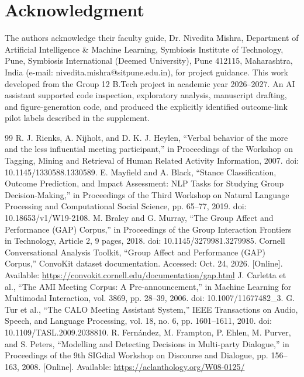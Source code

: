 \documentclass[journal]{IEEEtran}
\begin{document}
\section*{Acknowledgment}
The authors acknowledge their faculty guide, Dr. Nivedita Mishra, Department of Artificial Intelligence \& Machine Learning, Symbiosis Institute of Technology, Pune, Symbiosis International (Deemed University), Pune 412115, Maharashtra, India (e-mail: nivedita.mishra@sitpune.edu.in), for project guidance. This work developed from the Group 12 B.Tech project in academic year 2026--2027. An AI assistant supported code inspection, exploratory analysis, manuscript drafting, and figure-generation code, and produced the explicitly identified outcome-link pilot labels described in the supplement.

\clearpage
\begin{thebibliography}{99}
 R. J. Rienks, A. Nijholt, and D. K. J. Heylen, ``Verbal behavior of the more and the less influential meeting participant,'' in Proceedings of the Workshop on Tagging, Mining and Retrieval of Human Related Activity Information, 2007. doi: 10.1145/1330588.1330589.
 E. Mayfield and A. Black, ``Stance Classification, Outcome Prediction, and Impact Assessment: NLP Tasks for Studying Group Decision-Making,'' in Proceedings of the Third Workshop on Natural Language Processing and Computational Social Science, pp. 65--77, 2019. doi: 10.18653/v1/W19-2108.
 M. Braley and G. Murray, ``The Group Affect and Performance (GAP) Corpus,'' in Proceedings of the Group Interaction Frontiers in Technology, Article 2, 9 pages, 2018. doi: 10.1145/3279981.3279985.
 Cornell Conversational Analysis Toolkit, ``Group Affect and Performance (GAP) Corpus,'' ConvoKit dataset documentation. Accessed: Oct. 24, 2026. [Online]. Available: \url{https://convokit.cornell.edu/documentation/gap.html}
 J. Carletta et al., ``The AMI Meeting Corpus: A Pre-announcement,'' in Machine Learning for Multimodal Interaction, vol. 3869, pp. 28--39, 2006. doi: 10.1007/11677482\_3.
 G. Tur et al., ``The CALO Meeting Assistant System,'' IEEE Transactions on Audio, Speech, and Language Processing, vol. 18, no. 6, pp. 1601--1611, 2010. doi: 10.1109/TASL.2009.2038810.
 R. Fern\'{a}ndez, M. Frampton, P. Ehlen, M. Purver, and S. Peters, ``Modelling and Detecting Decisions in Multi-party Dialogue,'' in Proceedings of the 9th SIGdial Workshop on Discourse and Dialogue, pp. 156--163, 2008. [Online]. Available: \url{https://aclanthology.org/W08-0125/}

\end{thebibliography}
\end{document}
